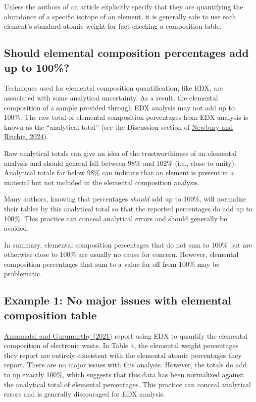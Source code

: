 \documentclass[letterpaper, 12pt]{article}
\begin{document}
Unless the authors of an article explicitly specify that they are quantifying the abundance of a specific isotope of an element, it is generally safe to use each element's standard atomic weight for fact-checking a composition table.

\subsection*{Should elemental composition percentages add up to 100\%?}

Techniques used for elemental composition quantification, like EDX, are associated with some analytical uncertainty. As a result, the elemental composition of a sample provided through EDX analysis may not add up to 100\%. The raw total of elemental composition percentages from EDX analysis is known as the ``analytical total'' (see the Discussion section of \href{https://doi.org/10.1007/s10853-024-10285-4}{Newbury and Ritchie, 2024}). 

Raw analytical totals can give an idea of the trustworthiness of an elemental analysis and should general fall between 98\% and 102\% (i.e., close to unity). Analytical totals far below 98\% can indicate that an element is present in a material but not included in the elemental composition analysis. 

Many authors, knowing that percentages \textit{should} add up to 100\%, will normalize their tables by this analytical total so that the reported percentages do add up to 100\%. This practice can conceal analytical errors and should generally be avoided.

In summary, elemental composition percentages that do not sum to 100\% but are otherwise close to 100\% are usually no cause for concern. However, elemental composition percentages that sum to a value far off from 100\% may be problematic.

\pagebreak

\subsection*{Example 1: No major issues with elemental composition table}

\href{https://doi.org/10.1080/10962247.2020.1813836}{Annamalai and Gurumurthy (2021)} report using EDX to quantify the elemental composition of electronic waste. In Table 4, the elemental weight percentages they report are entirely consistent with the elemental atomic percentages they report. There are no major issues with this analysis. However, the totals do add to up exactly 100\%, which suggests that this data has been normalized against the analytical total of elemental percentages. This practice can conceal analytical errors and is generally discouraged for EDX analysis.
\end{document}
